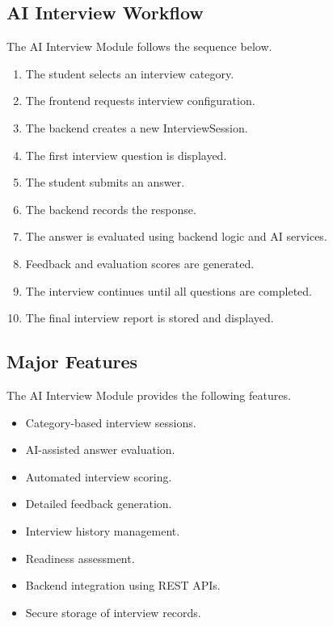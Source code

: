 \subsection{AI Interview Workflow}

The AI Interview Module follows the sequence below.

\begin{enumerate}

\item The student selects an interview category.

\item The frontend requests interview configuration.

\item The backend creates a new InterviewSession.

\item The first interview question is displayed.

\item The student submits an answer.

\item The backend records the response.

\item The answer is evaluated using backend logic and AI services.

\item Feedback and evaluation scores are generated.

\item The interview continues until all questions are completed.

\item The final interview report is stored and displayed.

\end{enumerate}

\subsection{Major Features}

The AI Interview Module provides the following features.

\begin{itemize}

\item Category-based interview sessions.

\item AI-assisted answer evaluation.

\item Automated interview scoring.

\item Detailed feedback generation.

\item Interview history management.

\item Readiness assessment.

\item Backend integration using REST APIs.

\item Secure storage of interview records.

\end{itemize}

